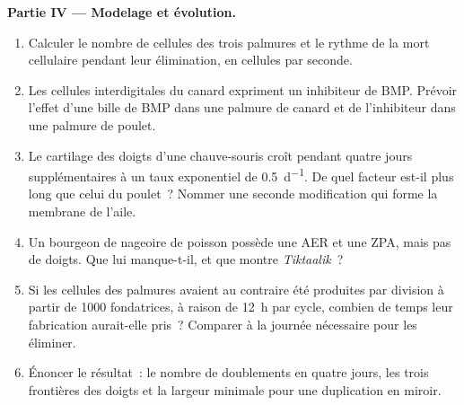 \begin{problem}
\medskip
\noindent\textbf{Partie IV --- Modelage et évolution.}
\begin{enumerate}[resume]
  \item Calculer le nombre de cellules des trois palmures et le rythme
        de la mort cellulaire pendant leur élimination, en cellules par
        seconde.
  \item Les cellules interdigitales du canard expriment un inhibiteur de
        BMP. Prévoir l'effet d'une bille de BMP dans une palmure de
        canard et de l'inhibiteur dans une palmure de poulet.
  \item Le cartilage des doigts d'une chauve-souris croît pendant quatre
        jours supplémentaires à un taux exponentiel de \qty{0.5}{d^{-1}}.
        De quel facteur est-il plus long que celui du poulet~? Nommer une
        seconde modification qui forme la membrane de l'aile.
  \item Un bourgeon de nageoire de poisson possède une AER et une ZPA,
        mais pas de doigts. Que lui manque-t-il, et que montre
        \emph{Tiktaalik}~?
  \item Si les cellules des palmures avaient au contraire été produites
        par division à partir de \num{1000} fondatrices, à raison de
        \qty{12}{h} par cycle, combien de temps leur fabrication
        aurait-elle pris~? Comparer à la journée nécessaire pour les
        éliminer.
  \item Énoncer le résultat~: le nombre de doublements en quatre jours,
        les trois frontières des doigts et la largeur minimale pour une
        duplication en miroir.
\end{enumerate}
\end{problem}
